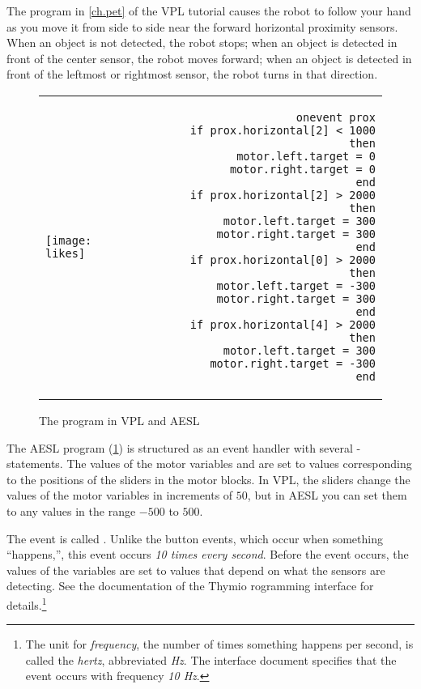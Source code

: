 The program  in \cref{ch.pet} of the VPL tutorial causes the
robot to follow your hand as you move it from side to side near the
forward horizontal proximity sensors.
When an object is not detected, the robot stops; when an object is
detected in front of the center sensor, the robot moves forward; when an
object is detected in front of the leftmost or rightmost sensor, the
robot turns in that direction.

\begin{figure}[hbt]
\begin{center}
\begin{tabular}{lr}
\texttt{[image: likes]} &
\begin{minipage}[b]{.4\textwidth}
\begin{footnotesize}
\begin{verbatim}
  onevent prox
    if prox.horizontal[2] < 1000 then
      motor.left.target = 0
      motor.right.target = 0
    end
    if prox.horizontal[2] > 2000 then
      motor.left.target = 300
      motor.right.target = 300
    end
    if prox.horizontal[0] > 2000 then
      motor.left.target = -300
      motor.right.target = 300
    end
    if prox.horizontal[4] > 2000 then
      motor.left.target = 300
      motor.right.target = -300
    end
\end{verbatim}
\end{footnotesize}
\end{minipage}
\end{tabular}
\caption{The  program in VPL and AESL}\label{fig.arrays}
\end{center}
\end{figure}

The AESL program (\cref{fig.arrays}) is structured as an event handler
with several -statements. The values of the motor variables
 and  are set to values
corresponding to the positions of the sliders in the motor blocks. In
VPL, the sliders change the values of the motor variables in increments
of $50$, but in AESL you can set them to any values in the range $-500$
to $500$.

The event is called . Unlike the button events, which
occur when something ``happens,'', this event occurs \emph{10 times
every second}. Before the event occurs, the values of the
 variables are set to values that depend on what the
sensors are detecting. See the\label{pg.hz} documentation of the
Thymio rogramming interface for details.\footnote{The unit
for \emph{frequency}, the number of times something happens per second, is called
the \emph{hertz}, abbreviated \emph{Hz}. The interface document specifies
that the {\footnotesize{}} event occurs with frequency \emph{10 Hz}.}

